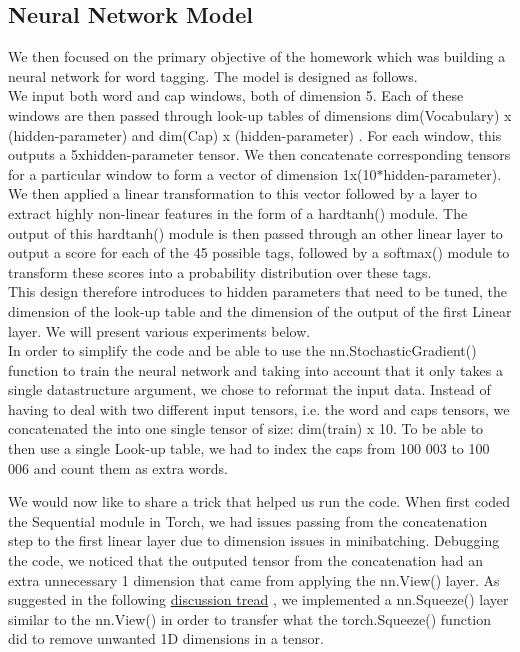 \documentclass[11pt]{article}
\begin{document}
\subsection{Neural Network Model}

We then focused on the primary objective of the homework which was building a neural network for word tagging. The model is designed as follows. \\

\noindent We input both word and cap windows, both of dimension 5. Each of these windows are then passed through look-up tables of dimensions dim(Vocabulary) x (hidden-parameter) and dim(Cap) x (hidden-parameter) . For each window, this outputs a 5xhidden-parameter tensor. We then concatenate corresponding tensors for a particular window to form a vector of dimension 1x(10$*$hidden-parameter).\\

\noindent We then applied a linear transformation to this vector followed by a layer to extract highly non-linear features in the form of a hardtanh() module. The output of this hardtanh() module is then passed through an other linear layer  to output a score for each of the 45 possible tags, followed by a softmax() module to transform these scores into a probability distribution over these tags. \\

\noindent This design therefore introduces to hidden parameters that need to be tuned, the dimension of the look-up table and the dimension of the output of the first Linear layer. We will present various experiments below.\\

\noindent In order to simplify the code and be able to use the nn.StochasticGradient() function to train the neural network and taking into account that it only takes a single datastructure argument, we chose to reformat the input data. Instead of having to deal with two different input tensors, i.e. the word and caps tensors, we concatenated the into one single tensor of size: dim(train) x 10. To be able to then use a single Look-up table, we had to index the caps from 100 003 to 100 006 and count them as extra words.

\noindent We would now like to share a trick that helped us run the code. When first coded the Sequential module in Torch, we had issues passing from the concatenation step to the first linear layer due to dimension issues in minibatching. Debugging the code, we noticed that the outputed tensor from the concatenation had an extra unnecessary 1 dimension that came from applying the nn.View() layer. As suggested in the following \href{https://groups.google.com/forum/#!topic/torch7/u4OEc0GB74k}{discussion tread} , we implemented a nn.Squeeze() layer similar to the nn.View() in order to transfer what the torch.Squeeze() function did to remove unwanted 1D dimensions in a tensor.\\
\end{document}
